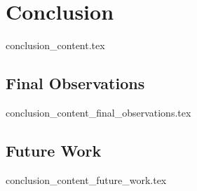 \chapter{Conclusion}\label{sec:conclusion}
  {conclusion_content.tex}

\section{Final Observations}
  {conclusion_content_final_observations.tex}

\section{Future Work}
  {conclusion_content_future_work.tex}
